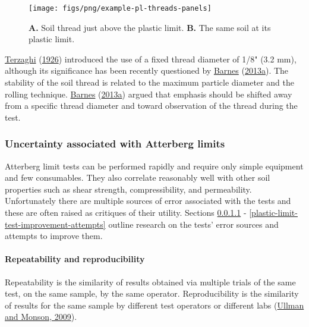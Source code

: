 \documentclass[
  letterpaper,
  openany]{book}
\begin{document}
\begin{figure}

{\centering \texttt{[image: figs/png/example-pl-threads-panels]} 

}

\caption[Soil threads above and at the plastic limit.]{\textbf{A.} Soil thread just above the plastic limit. \textbf{B.} The same soil at its plastic limit.}\label{fig:pl-test-procedure}
\end{figure}

\protect\hyperlink{ref-Terzaghi1926}{Terzaghi} (\protect\hyperlink{ref-Terzaghi1926}{1926}) introduced the use of a fixed thread diameter of 1/8" (3.2 mm), although its significance has been recently questioned by \protect\hyperlink{ref-Barnes2013}{Barnes} (\protect\hyperlink{ref-Barnes2013}{2013a}).
The stability of the soil thread is related to the maximum particle diameter and the rolling technique.
\protect\hyperlink{ref-Barnes2013}{Barnes} (\protect\hyperlink{ref-Barnes2013}{2013a}) argued that emphasis should be shifted away from a specific thread diameter and toward observation of the thread during the test.

\hypertarget{atterberg-limits-errors}{%
\subsubsection{Uncertainty associated with Atterberg limits}\label{atterberg-limits-errors}}

Atterberg limit tests can be performed rapidly and require only simple equipment and few consumables.
They also correlate reasonably well with other soil properties such as shear strength, compressibility, and permeability.
Unfortunately there are multiple sources of error associated with the tests and these are often raised as critiques of their utility.
Sections \ref{atterberg-limits-reproducibility-and-repeatability} - \ref{plastic-limit-test-improvement-attempts} outline research on the tests' error sources and attempts to improve them.

\hypertarget{atterberg-limits-reproducibility-and-repeatability}{%
\paragraph{Repeatability and reproducibility}\label{atterberg-limits-reproducibility-and-repeatability}}

Repeatability is the similarity of results obtained via multiple trials of the same test, on the same sample, by the same operator.
Reproducibility is the similarity of results for the same sample by different test operators or different labs (\protect\hyperlink{ref-Ullman2009}{Ullman and Monson, 2009}).
\end{document}
